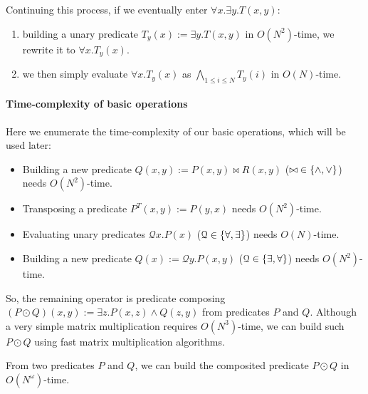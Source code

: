 
Continuing this process, if we eventually enter $\forall x. \exists y. T(x, y)$:
\begin{enumerate}
\item building a unary predicate $T_y(x) := \exists y. T(x, y)$ in $O(N^2)$-time, we rewrite it to $\forall x. T_y(x)$.
\item we then simply evaluate $\forall x. T_y(x)$ as $\bigwedge_{1 \leq i \leq N} T_y(i)$ in $O(N)$-time.
\end{enumerate}

\paragraph*{Time-complexity of basic operations}

Here we enumerate the time-complexity of our basic operations, which will be used later:
\begin{itemize}
\item Building a new predicate $Q(x, y) := P(x, y) \bowtie R(x, y)$ ($\mathord{\bowtie} \in \{ \land, \lor \}$) needs $O(N^2)$-time.
%
\item Transposing a predicate $P^T(x, y) := P(y, x)$ needs $O(N^2)$-time.
%
\item Evaluating unary predicates $\mathcal{Q} x. P(x)$ ($\mathcal{Q} \in \{\forall, \exists\}$) needs $O(N)$-time.
%
\item Building a new predicate $Q(x) := \mathcal{Q} y. P(x, y)$ ($\mathcal{Q} \in \{\exists, \forall\}$) needs $O(N^2)$-time.
\end{itemize}

So, the remaining operator is predicate composing $(P \odot Q)(x, y) := \exists z. P(x, z) \land Q(z, y)$ from predicates $P$ and $Q$.
Although a very simple matrix multiplication requires $O(N^3)$-time,
we can build such $P \odot Q$ using fast matrix multiplication algorithms.
\begin{proposition}[Fact]
From two predicates $P$ and $Q$, we can build the composited predicate $P \odot Q$ in $O(N^\omega)$-time.
\end{proposition}

